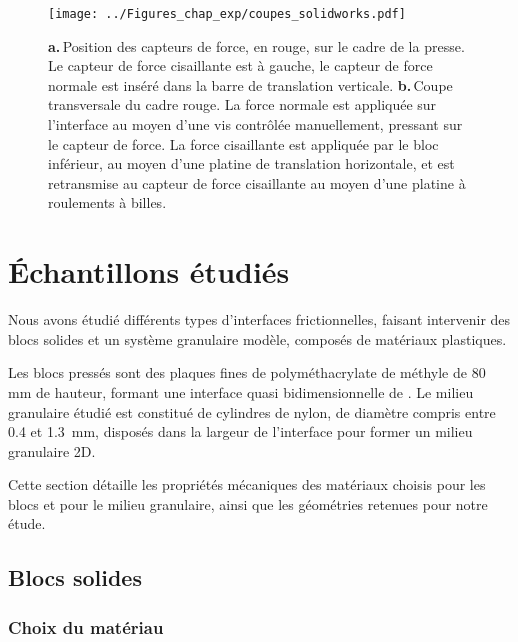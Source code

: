 \begin{figure}[h!]
\centering	
\texttt{[image: ../Figures\_chap\_exp/coupes\_solidworks.pdf]}
\caption[Disposition des capteurs de force]{\textbf{a.}\,Position des capteurs de force, en rouge, sur le cadre de la presse. Le capteur de force cisaillante est à gauche, le capteur de force normale est inséré dans la barre de translation verticale. \textbf{b.}\,Coupe transversale du cadre rouge. La force normale est appliquée sur l'interface au moyen d'une vis contrôlée manuellement, pressant sur le capteur de force. La force cisaillante est appliquée par le bloc inférieur, au moyen d'une platine de translation horizontale, et est retransmise au capteur de force cisaillante au moyen d'une platine à roulements à billes.}
\label{fig:captforce}
\end{figure}

\newpage


\section{Échantillons étudiés}
\label{sec:echantillons}

Nous avons étudié différents types d'interfaces frictionnelles, faisant intervenir des blocs solides et un système granulaire modèle, composés de matériaux plastiques.

Les blocs pressés sont des plaques fines de polyméthacrylate de méthyle de 80 mm de hauteur, formant une interface quasi bidimensionnelle de . Le milieu granulaire étudié est constitué de cylindres de nylon, de diamètre compris entre 0.4 et \SI{1.3}{\mm}, disposés dans la largeur de l'interface pour former un milieu granulaire 2D.

Cette section détaille les propriétés mécaniques des matériaux choisis pour les blocs et pour le milieu granulaire, ainsi que les géométries retenues pour notre étude.


\subsection{Blocs solides}

\subsubsection{Choix du matériau}
\label{sec:materials}

